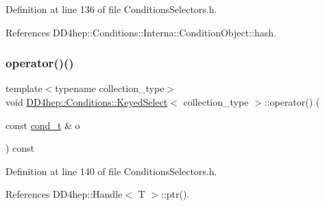 Definition at line 136 of file Conditions\+Selectors.\+h.



References D\+D4hep\+::\+Conditions\+::\+Interna\+::\+Condition\+Object\+::hash.

\hypertarget{class_d_d4hep_1_1_conditions_1_1_keyed_select_a2fb04380265c69a53a38b8b8e991a5f8}{}\label{class_d_d4hep_1_1_conditions_1_1_keyed_select_a2fb04380265c69a53a38b8b8e991a5f8} 
\subsubsection{\texorpdfstring{operator()()}{operator()()}\hspace{0.1cm}{\footnotesize\ttfamily [2/4]}}
{\footnotesize\ttfamily template$<$typename collection\+\_\+type$>$ \\
void \hyperlink{class_d_d4hep_1_1_conditions_1_1_keyed_select}{D\+D4hep\+::\+Conditions\+::\+Keyed\+Select}$<$ collection\+\_\+type $>$\+::operator() (\begin{DoxyParamCaption}\item[{const \hyperlink{class_d_d4hep_1_1_conditions_1_1_cond_____oper_aceca9f6a0e8c84364946eace47275d09}{cond\+\_\+t} \&}]{o }\end{DoxyParamCaption}) const\hspace{0.3cm}{\ttfamily [inline]}}



Definition at line 140 of file Conditions\+Selectors.\+h.



References D\+D4hep\+::\+Handle$<$ T $>$\+::ptr().

\hypertarget{class_d_d4hep_1_1_conditions_1_1_keyed_select_a5127027cac0e941b11a10c2d434e7ac9}{}\label{class_d_d4hep_1_1_conditions_1_1_keyed_select_a5127027cac0e941b11a10c2d434e7ac9} 
